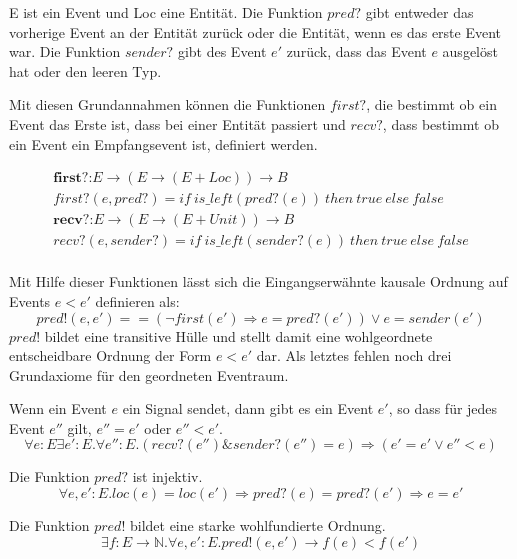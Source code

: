 E ist ein Event und Loc eine Entität. Die Funktion $pred?$ gibt entweder das
vorherige Event an der Entität zurück oder die Entität, wenn es das erste Event
war. Die Funktion $sender?$ gibt des Event $e'$ zurück, dass das Event $e$
ausgelöst hat oder den leeren Typ.~\cite{bickford2005causal}

Mit diesen Grundannahmen können die Funktionen $first?$, die bestimmt ob
ein Event das Erste ist, dass bei einer Entität passiert und $recv?$,
dass bestimmt ob ein Event ein Empfangsevent ist, definiert werden.

\begin{gather*}
  \textbf{first?:}E\rightarrow (E\rightarrow (E+Loc))\rightarrow B\\
  first?(e,pred?) = if\ is\_left(pred?(e))\ then\ true\ else\ false\\
  \textbf{recv?:}E\rightarrow (E\rightarrow (E+Unit))\rightarrow B\\
  recv?(e,sender?) = if\ is\_left(sender?(e))\ then\ true\ else\ false\\
\end{gather*}

Mit Hilfe dieser Funktionen lässt sich die Eingangserwähnte kausale Ordnung auf Events
$e < e'$ definieren als:
\[
  pred!(e,e') == (\neg first(e')\Rightarrow e = pred?(e')) \vee e = sender(e')
\]
$pred!$ bildet eine transitive Hülle und stellt damit eine wohlgeordnete
entscheidbare Ordnung der Form $e < e'$ dar. Als letztes fehlen noch
drei Grundaxiome für den geordneten Eventraum.~\cite{bickford2005causal}

\begin{axiom}
  Wenn ein Event $e$ ein Signal sendet, dann gibt es ein Event $e'$, so dass für
  jedes Event $e''$ gilt, $e'' = e'$ oder $e'' < e'$.\\
  \[
    \forall e:E \exists e':E. \forall e'':E . (recv?(e'') \& sender?(e'')=e)\Rightarrow (e' = e' \vee e'' < e)
  \]
\end{axiom}

\begin{axiom}
  Die Funktion $pred?$ ist injektiv.
  \[
    \forall e,e':E.loc(e) = loc(e')\Rightarrow pred?(e) = pred?(e')\Rightarrow e=e'
  \]
\end{axiom}

\begin{axiom}
  Die Funktion $pred!$ bildet eine starke wohlfundierte Ordnung.
  \[
    \exists f:E\rightarrow \mathbb{N}.\forall e,e':E.pred!(e,e')\rightarrow f(e)<f(e')
  \]
\end{axiom}

